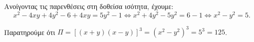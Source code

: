 
\begin{alist}
\item Ανοίγοντας τις παρενθέσεις στη δοθείσα ισότητα, έχουμε:
\[x^2 - 4xy + 4y^2 - 6 + 4xy = 5y^2 - 1 \Leftrightarrow x^2 + 4y^2 - 5y^2 = 6 - 1 \Leftrightarrow x^2 - y^2 = 5.\]

\item Παρατηρούμε ότι $\Pi = [(x + y)(x - y)]^3 = (x^2 - y^2)^3 = 5^3 = 125$.
\end{alist}

